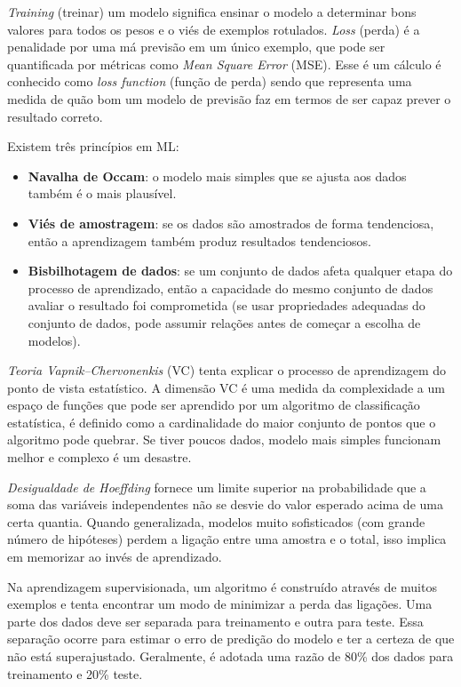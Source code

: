 \textit{Training} (treinar) um modelo significa ensinar o modelo a determinar bons valores para todos os pesos e o viés de exemplos rotulados. \textit{Loss} (perda) é a penalidade por uma má previsão em um único exemplo, que pode ser quantificada por métricas como \textit{Mean Square Error} (MSE). Esse é um cálculo é conhecido como \textit{loss function} (função de perda) sendo que representa uma medida de quão bom um modelo de previsão faz em termos de ser capaz prever o resultado correto.

Existem três princípios em ML: \vspace{-1em}
\begin{itemize}
	\item \textbf{Navalha de Occam}: o modelo mais simples que se ajusta aos dados também é o mais plausível.
	\item \textbf{Viés de amostragem}: se os dados são amostrados de forma tendenciosa, então a aprendizagem também produz resultados tendenciosos.
	\item \textbf{Bisbilhotagem de dados}: se um conjunto de dados afeta qualquer etapa do processo de aprendizado, então a capacidade do mesmo conjunto de dados avaliar o resultado foi comprometida (se usar propriedades adequadas do conjunto de dados, pode assumir relações antes de começar a escolha de modelos).
\end{itemize}

\textit{Teoria Vapnik–Chervonenkis} (VC) tenta explicar o processo de aprendizagem do ponto de vista estatístico. A dimensão VC é uma medida da complexidade a um espaço de funções que pode ser aprendido por um algoritmo de classificação estatística, é definido como a cardinalidade do maior conjunto de pontos que o algoritmo pode quebrar. Se tiver poucos dados, modelo mais simples funcionam melhor e complexo é um desastre.

\textit{Desigualdade de Hoeffding} fornece um limite superior na probabilidade que a soma das variáveis independentes não se desvie do valor esperado acima de uma certa quantia. Quando generalizada, modelos muito sofisticados (com grande número de hipóteses) perdem a ligação entre uma amostra e o total, isso implica em memorizar ao invés de aprendizado.

Na aprendizagem supervisionada, um algoritmo é construído através de muitos exemplos e tenta encontrar um modo de minimizar a perda das ligações. Uma parte dos dados deve ser separada para treinamento e outra para teste. Essa separação ocorre para estimar o erro de predição do modelo e ter a certeza de que não está superajustado. Geralmente, é adotada uma razão de 80\% dos dados para treinamento e 20\% teste.


